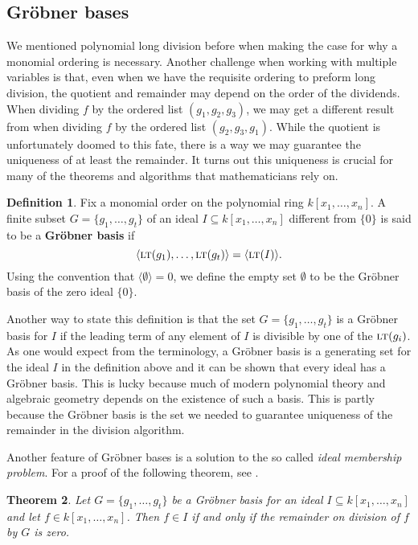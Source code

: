 \documentclass[MS, xcolor=dvipsnames]{wfuthesis}
\def\sbs{\subseteq}
\newcommand{\LT}{\ensuremath{\text{\sc lt}}}
\newtheorem{theorem}{Theorem}
\theoremstyle{definition}
\newtheorem{definition}[theorem]{Definition}
\begin{document}
\subsection{Gr\"obner bases}
We mentioned polynomial long division before when making the case for why a monomial ordering is necessary. Another challenge when working with multiple variables is that, even when we have the requisite ordering to preform long division, the quotient and remainder may depend on the order of the dividends. When dividing $f$ by the ordered list $(g_1,g_2,g_3)$, we may get a different result from when dividing $f$ by the ordered list $(g_2,g_3,g_1)$. While the quotient is unfortunately doomed to this fate, there is a way we may guarantee the uniqueness of at least the remainder. It turns out this uniqueness is crucial for many of the theorems and algorithms that mathematicians rely on. \par 
\begin{definition}
  Fix a monomial order on the polynomial ring $k[x_1,\dots,x_n]$. A finite subset $G = \{ g_1,\dots,g_t \}$ of an ideal $I \sbs k[x_1,\dots,x_n]$ different from $\{0\}$ is said to be a \textbf{Gr\"obner basis} if
  \[ \langle \LT(g_1), \dots, \LT(g_t) \rangle = \langle \LT(I) \rangle. \]
  Using the convention that $\langle \emptyset \rangle = {0}$, we define the empty set $\emptyset$ to be the Gr\"obner basis of the zero ideal $\{0\}$.
\end{definition}
Another way to state this definition is that the set $G = \{ g_1,\dots,g_t \}$ is a Gr\"obner basis for $I$ if the leading term of any element of $I$ is divisible by one of the $\LT(g_i)$. As one would expect from the terminology, a Gr\"obner basis is a generating set for the ideal $I$ in the definition above and it can be shown that every ideal has a Gr\"obner basis. This is lucky because much of modern polynomial theory and algebraic geometry depends on the existence of such a basis. This is partly because the Gr\"obner basis is the set we needed to guarantee uniqueness of the remainder in the division algorithm. \par 
Another feature of Gr\"obner bases is a solution to the so called \emph{ideal membership problem}. For a proof of the following theorem, see \cite{Cox2015}.
\begin{theorem}
  Let $G = \{ g_1,\dots,g_t \}$ be a Gr\"obner basis for an ideal $I \sbs k[x_1,\dots,x_n]$ and let $f \in k[x_1,\dots,x_n]$. Then $f \in I$ if and only if the remainder on division of $f$ by $G$ is zero. 
\end{theorem}
\end{document}
